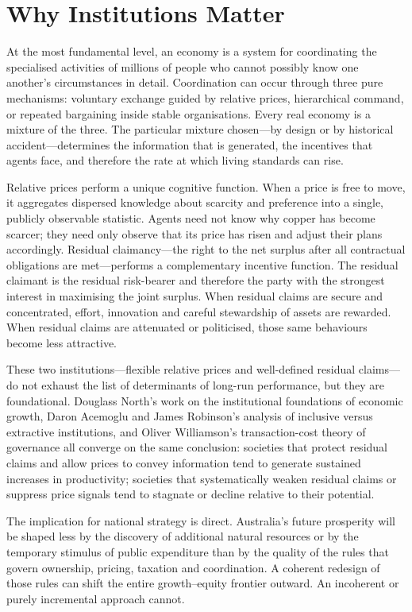 \documentclass[12pt,anyside]{book}
\theoremstyle{definition}
\theoremstyle{plain}
\theoremstyle{remark}
\begin{document}
\section{Why Institutions Matter}

At the most fundamental level, an economy is a system for coordinating the specialised activities of millions of people who cannot possibly know one another’s circumstances in detail. Coordination can occur through three pure mechanisms: voluntary exchange guided by relative prices, hierarchical command, or repeated bargaining inside stable organisations. Every real economy is a mixture of the three. The particular mixture chosen—by design or by historical accident—determines the information that is generated, the incentives that agents face, and therefore the rate at which living standards can rise.

Relative prices perform a unique cognitive function. When a price is free to move, it aggregates dispersed knowledge about scarcity and preference into a single, publicly observable statistic. Agents need not know why copper has become scarcer; they need only observe that its price has risen and adjust their plans accordingly. Residual claimancy—the right to the net surplus after all contractual obligations are met—performs a complementary incentive function. The residual claimant is the residual risk-bearer and therefore the party with the strongest interest in maximising the joint surplus. When residual claims are secure and concentrated, effort, innovation and careful stewardship of assets are rewarded. When residual claims are attenuated or politicised, those same behaviours become less attractive.

These two institutions—flexible relative prices and well-defined residual claims—do not exhaust the list of determinants of long-run performance, but they are foundational. Douglass North’s work on the institutional foundations of economic growth, Daron Acemoglu and James Robinson’s analysis of inclusive versus extractive institutions, and Oliver Williamson’s transaction-cost theory of governance all converge on the same conclusion: societies that protect residual claims and allow prices to convey information tend to generate sustained increases in productivity; societies that systematically weaken residual claims or suppress price signals tend to stagnate or decline relative to their potential.

The implication for national strategy is direct. Australia’s future prosperity will be shaped less by the discovery of additional natural resources or by the temporary stimulus of public expenditure than by the quality of the rules that govern ownership, pricing, taxation and coordination. A coherent redesign of those rules can shift the entire growth–equity frontier outward. An incoherent or purely incremental approach cannot.
\end{document}
